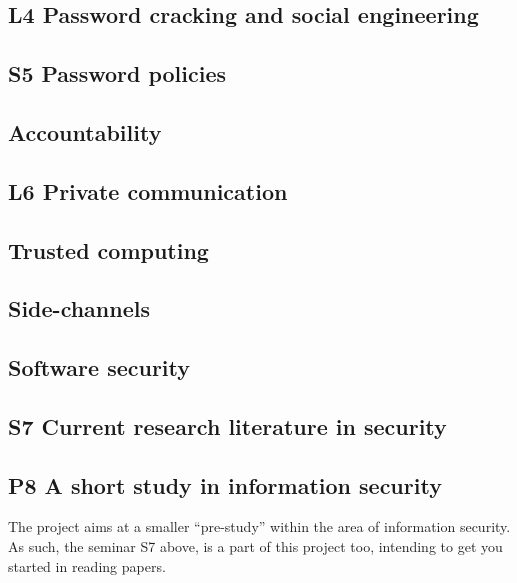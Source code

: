 \subsection{L4 Password cracking and social engineering}


\subsection{S5 Password policies}


\subsection{Accountability}


\subsection{L6 Private communication}


\subsection{Trusted computing}


\subsection{Side-channels}


\subsection{Software security}


\subsection{S7 Current research literature in security}


\subsection{P8 A short study in information security}

The project aims at a smaller \enquote{pre-study} within the area of 
information security.
As such, the seminar S7 above, is a part of this project too, intending to get 
you started in reading papers.



